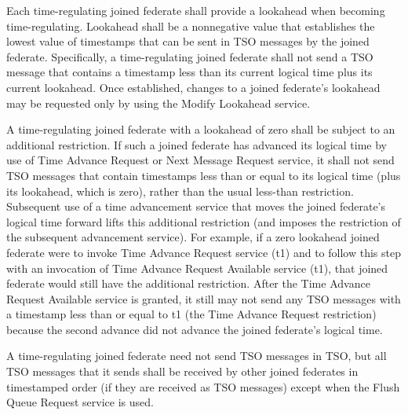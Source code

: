 \begin{compactstdpage}
    Each time-regulating joined federate shall provide a lookahead when becoming time-regulating. Lookahead shall be a nonnegative value that establishes the lowest value of timestamps that can be sent in TSO messages by the joined federate. Specifically, a time-regulating joined federate shall not send a TSO message that contains a timestamp less than its current logical time plus its current lookahead. Once established, changes to a joined federate's lookahead may be requested only by using the Modify Lookahead service.

    A time-regulating joined federate with a lookahead of zero shall be subject to an additional restriction. If such a joined federate has advanced its logical time by use of Time Advance Request or Next Message Request service, it shall not send TSO messages that contain timestamps less than or equal to its logical time (plus its lookahead, which is zero), rather than the usual less-than restriction. Subsequent use of a time advancement service that moves the joined federate's logical time forward lifts this additional restriction (and imposes the restriction of the subsequent advancement service). For example, if a zero lookahead joined federate were to invoke Time Advance Request service (t1) and to follow this step with an invocation of Time Advance Request Available service (t1), that joined federate would still have the additional restriction. After the Time Advance Request Available service is granted, it still may not send any TSO messages with a timestamp less than or equal to t1 (the Time Advance Request restriction) because the second advance did not advance the joined federate's logical time.

    A time-regulating joined federate need not send TSO messages in TSO, but all TSO messages that it sends shall be received by other joined federates in timestamped order (if they are received as TSO messages) except when the Flush Queue Request service is used.


\end{compactstdpage}

\clearpage

